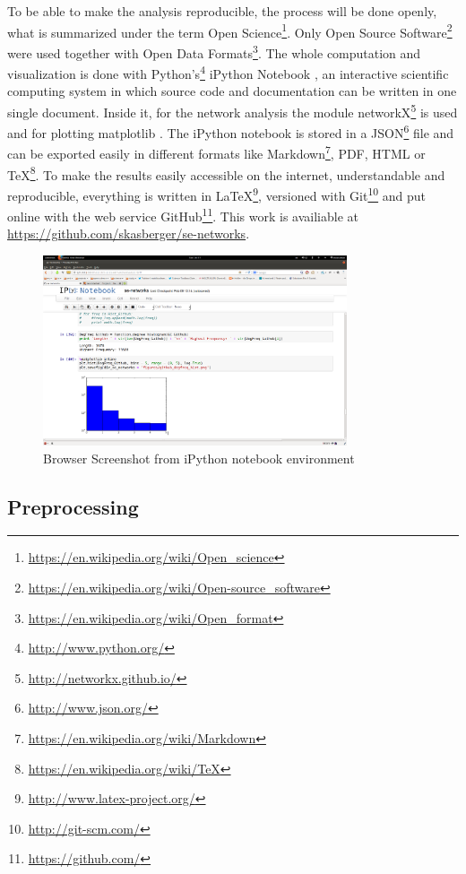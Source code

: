 \documentclass[
a4paper,     %
12pt         %
]{scrartcl}  %
\begin{document}
To be able to make the analysis reproducible, the process will be done openly, what is summarized under the term Open Science\footnote{\url{https://en.wikipedia.org/wiki/Open_science}}. Only Open Source Software\footnote{\url{https://en.wikipedia.org/wiki/Open-source_software}} were used together with Open Data Formats\footnote{\url{https://en.wikipedia.org/wiki/Open_format}}.
The whole computation and visualization is done with Python's\footnote{\url{http://www.python.org/}} iPython Notebook \citep{PER-GRA:2007}, an interactive scientific computing system in which source code and documentation can be written in one single document. Inside it, for the network analysis the module networkX\footnote{\url{http://networkx.github.io/}} is used and for plotting matplotlib \citep{Hunter:2007}. The iPython notebook is stored in a JSON\footnote{\url{http://www.json.org/}} file and can be exported easily in different formats like Markdown\footnote{\url{https://en.wikipedia.org/wiki/Markdown}}, PDF, HTML or TeX\footnote{\url{https://en.wikipedia.org/wiki/TeX}}. To make the results easily accessible on the internet, understandable and reproducible, everything is written in LaTeX\footnote{\url{http://www.latex-project.org/}}, versioned with Git\footnote{\url{http://git-scm.com/}} and put online with the web service GitHub\footnote{\url{https://github.com/}}. This work is availiable at \url{https://github.com/skasberger/se-networks}.

\begin{figure}
  \centering
  \includegraphics[width=0.8\textwidth]{./images/screenshot-ipython.png}
  \caption{Browser Screenshot from iPython notebook environment}
  \label{fig:screenshot-ipython}
\end{figure}

\subsection{Preprocessing}
\label{sub:preprocessing}
\end{document}
